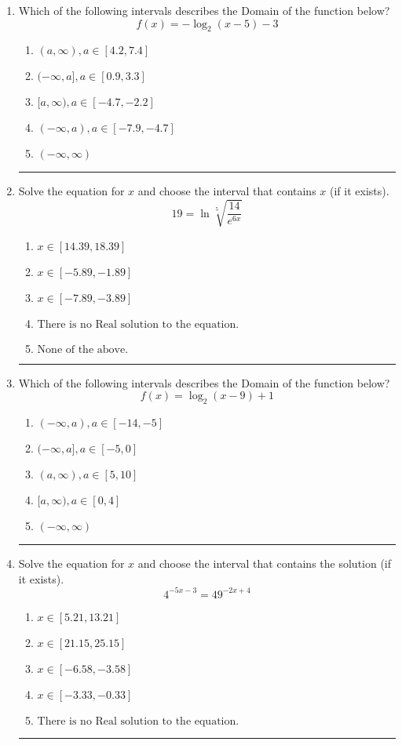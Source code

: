 \documentclass[14pt]{extbook}
\newcommand{\litem}[1]{\item#1\hspace*{-1cm}\rule{\textwidth}{0.4pt}}
\begin{document}
\begin{enumerate}
{\begin{enumerate}[label=\Alph*.]
\end{enumerate} }
\litem{
Which of the following intervals describes the Domain of the function below?\[ f(x) = -\log_2{(x-5)}-3 \]\begin{enumerate}[label=\Alph*.]
\item \( (a, \infty), a \in [4.2, 7.4] \)
\item \( (-\infty, a], a \in [0.9, 3.3] \)
\item \( [a, \infty), a \in [-4.7, -2.2] \)
\item \( (-\infty, a), a \in [-7.9, -4.7] \)
\item \( (-\infty, \infty) \)

\end{enumerate} }
\litem{
 Solve the equation for $x$ and choose the interval that contains $x$ (if it exists).\[  19 = \ln{\sqrt[5]{\frac{14}{e^{6x}}}} \]\begin{enumerate}[label=\Alph*.]
\item \( x \in [14.39, 18.39] \)
\item \( x \in [-5.89, -1.89] \)
\item \( x \in [-7.89, -3.89] \)
\item \( \text{There is no Real solution to the equation.} \)
\item \( \text{None of the above.} \)

\end{enumerate} }
\litem{
Which of the following intervals describes the Domain of the function below?\[ f(x) = \log_2{(x-9)}+1 \]\begin{enumerate}[label=\Alph*.]
\item \( (-\infty, a), a \in [-14, -5] \)
\item \( (-\infty, a], a \in [-5, 0] \)
\item \( (a, \infty), a \in [5, 10] \)
\item \( [a, \infty), a \in [0, 4] \)
\item \( (-\infty, \infty) \)

\end{enumerate} }
\litem{
Solve the equation for $x$ and choose the interval that contains the solution (if it exists).\[ 4^{-5x-3} = 49^{-2x+4} \]\begin{enumerate}[label=\Alph*.]
\item \( x \in [5.21, 13.21] \)
\item \( x \in [21.15, 25.15] \)
\item \( x \in [-6.58, -3.58] \)
\item \( x \in [-3.33, -0.33] \)
\item \( \text{There is no Real solution to the equation.} \)


\end{enumerate}}
\end{enumerate}
\end{document}
